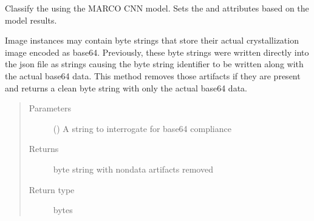 \documentclass[letterpaper,10pt,english]{sphinxmanual}
\begin{document}
\begin{fulllineitems}

\begin{fulllineitems}
\label{\detokenize{polo.crystallography:polo.crystallography.image.Image.classify_image}}
Classify the {\hyperref[\detokenize{polo.crystallography:polo.crystallography.image.Image}]{}}
using the MARCO CNN model. Sets the 
 and 
attributes based on the model results.

\end{fulllineitems}


\begin{fulllineitems}
\label{\detokenize{polo.crystallography:polo.crystallography.image.Image.clean_base64_string}}
Image instances may contain byte strings that store their actual
crystallization image encoded as base64. Previously, these byte strings
were written directly into the json file as strings causing the 
byte string identifier to be written along with the actual base64 data.
This method removes those artifacts if they are present and returns a
clean byte string with only the actual base64 data.
\begin{quote}\begin{description}
\item[{Parameters}] \leavevmode
{} () \textendash{} A string to interrogate for base64 compliance

\item[{Returns}] \leavevmode
byte string with non\sphinxhyphen{}data artifacts removed

\item[{Return type}] \leavevmode
bytes

\end{description}\end{quote}


\end{fulllineitems}
\end{fulllineitems}
\end{document}
